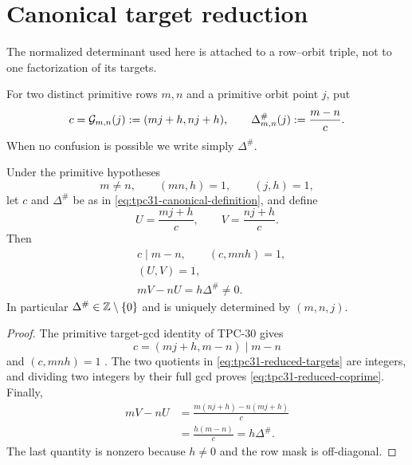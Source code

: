 \section{Canonical target reduction}
\label{sec:tpc31-canonical}

The normalized determinant used here is attached to a row--orbit
triple, not to one factorization of its targets.

\begin{definition}
\label{def:tpc31-canonical-determinant}
For two distinct primitive rows $m,n$ and a primitive orbit point
$j$, put
\begin{equation}
 c=\mathcal G_{m,n}(j):=(mj+h,nj+h),
 \qquad
 \Delta^\#_{m,n}(j):=\frac{m-n}{c}.
 \label{eq:tpc31-canonical-definition}
\end{equation}
When no confusion is possible we write simply $\Delta^\#$.
\end{definition}

\begin{proposition}
\label{prop:tpc31-canonical-reduction}
Under the primitive hypotheses
\begin{equation}
 m\ne n,\qquad (mn,h)=1,\qquad (j,h)=1,
 \label{eq:tpc31-canonical-hypotheses}
\end{equation}
let $c$ and $\Delta^\#$ be as in
\eqref{eq:tpc31-canonical-definition}, and define
\begin{equation}
 U=\frac{mj+h}{c},
 \qquad
 V=\frac{nj+h}{c}.
 \label{eq:tpc31-reduced-targets}
\end{equation}
Then
\begin{align}
 &c\mid m-n,\qquad (c,mnh)=1,
 \label{eq:tpc31-content-properties}\\
 &(U,V)=1,
 \label{eq:tpc31-reduced-coprime}\\
 &\boxed{mV-nU=h\Delta^\#\ne0.}
 \label{eq:tpc31-canonical-determinant-identity}
\end{align}
In particular $\Delta^\#\in\mathbb Z\setminus\{0\}$ and is uniquely
determined by $(m,n,j)$.
\end{proposition}

\begin{proof}
The primitive target-gcd identity of TPC-30 gives
\begin{equation}
 c=(mj+h,m-n)\mid m-n
 \label{eq:tpc31-inherited-content-identity}
\end{equation}
and $(c,mnh)=1$ \citep{WangTPC30}.  The two quotients in
\eqref{eq:tpc31-reduced-targets} are integers, and dividing two
integers by their full gcd proves \eqref{eq:tpc31-reduced-coprime}.
Finally,
\begin{align*}
 mV-nU
 &=\frac{m(nj+h)-n(mj+h)}c\\
 &=\frac{h(m-n)}c
 =h\Delta^\#.
\end{align*}
The last quantity is nonzero because $h\ne0$ and the row mask is
off-diagonal.
\end{proof}

